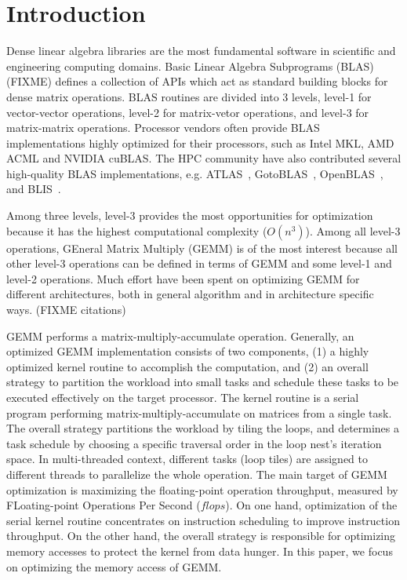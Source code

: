 \section{Introduction}\label{sec:intro}
Dense linear algebra libraries are the most fundamental software in
scientific and engineering computing domains.
Basic Linear Algebra Subprograms (BLAS) (FIXME) defines a collection
of APIs which act as standard building blocks for dense matrix operations.
BLAS routines are divided into 3 levels,
level-1 for vector-vector operations,
level-2 for matrix-vetor operations,
and level-3 for matrix-matrix operations.
Processor vendors often provide BLAS implementations
highly optimized for their processors,
such as Intel MKL, AMD ACML and NVIDIA cuBLAS.
The HPC community have also contributed several high-quality
BLAS implementations, e.g. ATLAS~\cite{atlas},
GotoBLAS~\cite{gotoblas}, OpenBLAS~\cite{openblas},
and BLIS~\cite{blis}\cite{blisport}.

Among three levels, level-3 provides the most opportunities
for optimization because it has the highest computational complexity ($O(n^3)$).
Among all level-3 operations, GEneral Matrix Multiply (GEMM) is
of the most interest because all other level-3 operations can be defined
in terms of GEMM and some level-1 and level-2 operations.
Much effort have been spent on optimizing GEMM for different architectures,
both in general algorithm and in architecture specific ways.
(FIXME citations)

GEMM performs a matrix-multiply-accumulate operation.
Generally, an optimized GEMM implementation consists of two components,
(1) a highly optimized kernel routine to accomplish the computation, and
(2) an overall strategy to partition the workload into small tasks
and schedule these tasks to be executed effectively on the target processor.
The kernel routine is a serial program performing matrix-multiply-accumulate
on matrices from a single task.
The overall strategy partitions the workload by tiling the loops,
and determines a task schedule by choosing a specific traversal order
in the loop nest's iteration space.
In multi-threaded context, different tasks (loop tiles) are assigned to
different threads to parallelize the whole operation.
The main target of GEMM optimization is maximizing the floating-point
operation throughput, measured by FLoating-point Operations Per Second ($flops$).
On one hand, optimization of the serial kernel routine concentrates on
instruction scheduling to improve instruction throughput.
On the other hand, the overall strategy is responsible for optimizing
memory accesses to protect the kernel from data hunger.
In this paper, we focus on optimizing the memory access of GEMM.

